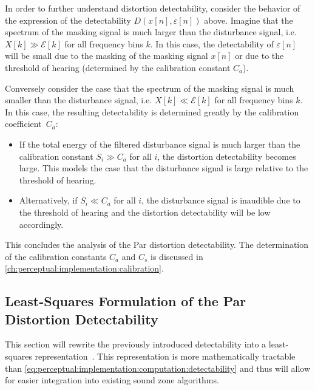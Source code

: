 In order to further understand distortion detectability, consider the behavior of the expression of the 
detectability $D(x[n],\varepsilon[n])$ above.
Imagine that the spectrum of the masking signal is much larger than the disturbance signal, 
i.e. $X[k] \gg \mathcal{E}[k]$ for all frequency bins $k$.
In this case, the detectability of $\varepsilon[n]$ will be small due to the masking of the masking signal $x[n]$ or
due to the threshold of hearing (determined by the calibration constant $C_a$).

Conversely consider the case that the spectrum of the masking signal is much smaller than the disturbance signal,
i.e. $X[k] \ll \mathcal{E}[k]$ for all frequency bins $k$.
In this case, the resulting detectability is determined greatly by the calibration coefficient~$C_a$: 
\begin{itemize}
    \item If the total energy of the filtered disturbance signal is much larger than the calibration constant 
        $S_i \gg C_a$ for all $i$, the distortion detectability becomes large.
        This models the case that the disturbance signal is large relative to the threshold of hearing.
    \item Alternatively, if $S_i \ll C_a$ for all $i$, the disturbance signal is 
        inaudible due to the threshold of hearing and the distortion detectability will be low accordingly.
\end{itemize}

This concludes the analysis of the Par distortion detectability.
The determination of the calibration constants $C_a$ and $C_s$ is discussed in \autoref{ch:perceptual:implementation:calibration}.


\subsection{Least-Squares Formulation of the Par Distortion Detectability}
\label{ch:perceptual:implementation:least_squares}
This section will rewrite the previously introduced detectability into a least-squares representation~\cite{taal2012low}. 
This representation is more mathematically tractable than 
\autoref{eq:perceptual:implementation:computation:detectability} and thus 
will allow for easier integration into existing sound zone algorithms.

